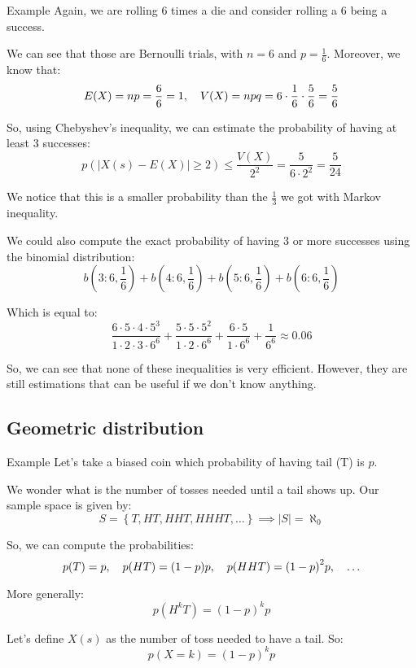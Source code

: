 \documentclass[a4paper]{article}
\begin{document}
\begin{parag}{Example}
    Again, we are rolling 6 times a die and consider rolling a 6 being a success. 

    We can see that those are Bernoulli trials, with $n = 6$ and $p = \frac{1}{6}$. Moreover, we know that: 
    \[E\left(X\right) = np = \frac{6}{6} = 1, \mathspace V\left(X\right) = npq = 6\cdot \frac{1}{6} \cdot \frac{5}{6} = \frac{5}{6}\]
    
    So, using Chebyshev's inequality, we can estimate the probability of having at least 3 successes: 
    \[p\left(\left|X\left(s\right) - E\left(X\right)\right| \geq 2\right) \leq \frac{V\left(X\right)}{2^2} = \frac{5}{6\cdot 2^2} = \frac{5}{24}\]
    
    We notice that this is a smaller probability than the $\frac{1}{3}$ we got with Markov inequality.

    We could also compute the exact probability of having 3 or more successes using the binomial distribution: 
    \[b\left(3: 6, \frac{1}{6}\right) + b\left(4: 6, \frac{1}{6}\right) + b\left(5: 6, \frac{1}{6}\right) + b\left(6: 6, \frac{1}{6}\right)\]

    Which is equal to: 
    \[\frac{6\cdot 5\cdot 4\cdot 5^3}{1\cdot 2\cdot 3\cdot 6^6} + \frac{5\cdot 5\cdot 5^2}{1\cdot 2\cdot 6^6} + \frac{6\cdot 5}{1\cdot 6^6} + \frac{1}{6^6} \approx 0.06\]
    
    
    So, we can see that none of these inequalities is very efficient. However, they are still estimations that can be useful if we don't know anything.
\end{parag}

\subsection{Geometric distribution}
\begin{parag}{Example}
    Let's take a biased coin which probability of having tail (T) is $p$.

    We wonder what is the number of tosses needed until a tail shows up. Our sample space is given by: 
    \[S = \left\{T, HT, HHT, HHHT, \ldots\right\} \implies \left|S\right| = \aleph_0\]

    So, we can compute the probabilities: 
    \[p\left(T\right) = p, \mathspace p\left(HT\right) = \left(1 - p\right)p, \mathspace p\left(HHT\right) = \left(1 - p\right)^2 p, \mathspace \ldots\]
    
    More generally: 
    \[p\left(H^k T\right) = \left(1 - p\right)^k p\]
    
    Let's define $X\left(s\right)$ as the number of toss needed to have a tail. So:
    \[p\left(X = k\right) = \left(1 - p\right)^k p\]
\end{parag}
\end{document}
